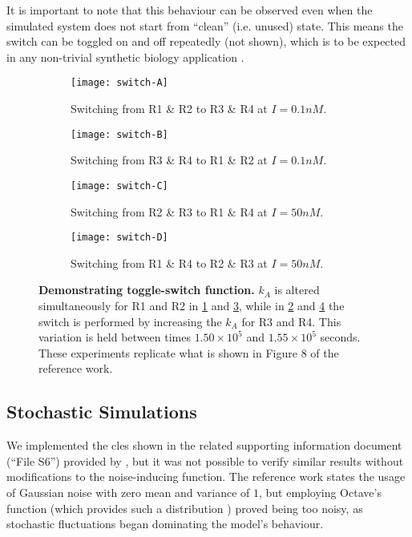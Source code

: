    It is important to note that this behaviour can be observed even when the simulated system does not start from ``clean'' (i.e. unused) state.
    This means the switch can be toggled on and off repeatedly (not shown), which is to be expected in any non-trivial synthetic biology application \cite{reconfgate}.

    \begin{figure}[!htb]
      \centering
      \begin{subfigure}[t]{0.48\textwidth}
        \centering
        \texttt{[image: switch-A]}
        \caption{Switching from R1 \& R2 to R3 \& R4 at $I = 0.1 nM$.}
        \label{fig:switch-A}
      \end{subfigure}
      \hfill
      \begin{subfigure}[t]{0.48\textwidth}
        \centering
        \texttt{[image: switch-B]}
        \caption{Switching from R3 \& R4 to R1 \& R2 at $I = 0.1 nM$.}
        \label{fig:switch-B}
      \end{subfigure}
      \medskip
      \begin{subfigure}[t]{0.48\textwidth}
        \centering
        \texttt{[image: switch-C]}
        \caption{Switching from R2 \& R3 to R1 \& R4 at $I = 50 nM$.}
        \label{fig:switch-C}
      \end{subfigure}
      \hfill
      \begin{subfigure}[t]{0.48\textwidth}
        \centering
        \texttt{[image: switch-D]}
        \caption{Switching from R1 \& R4 to R2 \& R3 at $I = 50 nM$.}
        \label{fig:switch-D}
      \end{subfigure}
      \caption{\textbf{Demonstrating toggle-switch function.} $k_A$ is altered simultaneously for R1 and R2 in \ref{fig:switch-A} and \ref{fig:switch-C}, while in \ref{fig:switch-B} and \ref{fig:switch-D} the switch is performed by increasing the $k_A$ for R3 and R4. This variation is held between times $1.50 \times 10^5$ and $1.55 \times 10^5$ seconds. These experiments replicate what is shown in Figure 8 of the reference work.}
      \label{fig:switch}
    \end{figure}


  \subsection{Stochastic Simulations}

    We implemented the \ac{cles} shown in the related supporting information document (``File S6'') provided by \citet{multif}, but it was not possible to verify similar results without modifications to the noise-inducing function.
    The reference work states the usage of Gaussian noise with zero mean and variance of $1$, but employing Octave's  function (which provides such a distribution \cite{randn}) proved being too noisy, as stochastic fluctuations began dominating the model's behaviour.

